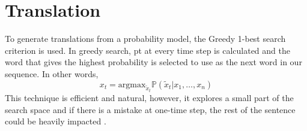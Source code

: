 \section{Translation}
To generate translations from a probability model, the Greedy 1-best search criterion is used. In greedy search, pt at every time step is calculated and the word that gives the highest probability is selected to use as the next word in our sequence. In other words,
\begin{equation}
x_t = \text{argmax} _{\tilde{x}_t} \mathbb{P}(\tilde{x}_t | x_1, \ldots, x_n)
\end{equation}
This technique is efficient and natural, however, it explores a small part of the search space and if there is a mistake at one-time step, the rest of the sentence could be heavily impacted \cite{manning2019cs224n}.